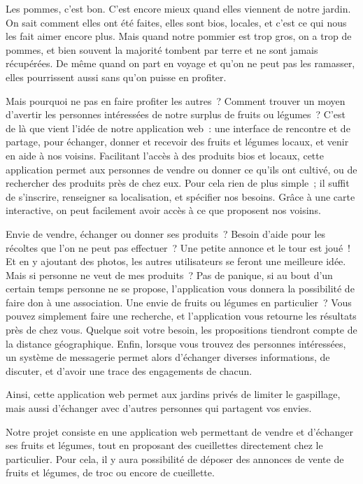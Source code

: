 \documentclass{article}
\begin{document}
Les pommes, c'est bon. C'est encore mieux quand elles viennent de notre jardin. On sait comment elles ont été faites, elles sont bios, locales, et c'est ce qui nous les fait aimer encore plus. Mais quand notre pommier est trop gros, on a trop de pommes, et bien souvent la majorité tombent par terre et ne sont jamais récupérées. De même quand on part en voyage et qu'on ne peut pas les ramasser, elles pourrissent aussi sans qu'on puisse en profiter.

Mais pourquoi ne pas en faire profiter les autres ? Comment trouver un moyen d'avertir les personnes intéressées de notre surplus de fruits ou légumes ? C'est de là que vient l'idée de notre application web : une interface de rencontre et de partage, pour échanger, donner et recevoir des fruits et légumes locaux, et venir en aide à nos voisins.
Facilitant l'accès à des produits bios et locaux, cette application permet aux personnes de vendre ou donner ce qu'ils ont cultivé, ou de rechercher des produits près de chez eux. Pour cela rien de plus simple ; il suffit de s'inscrire, renseigner sa localisation, et spécifier nos besoins. Grâce à une carte interactive, on peut facilement avoir accès à ce que proposent nos voisins.

Envie de vendre, échanger ou donner ses produits ? Besoin d'aide pour les récoltes que l'on ne peut pas effectuer ? Une petite annonce et le tour est joué ! Et en y ajoutant des photos, les autres utilisateurs se feront une meilleure idée. Mais si personne ne veut de mes produits ? Pas de panique, si au bout d'un certain temps personne ne se propose, l'application vous donnera la possibilité de faire don à une association.
Une envie de fruits ou légumes en particulier ? Vous pouvez simplement faire une recherche, et l'application vous retourne les résultats près de chez vous. Quelque soit votre besoin, les propositions tiendront compte de la distance géographique.
Enfin, lorsque vous trouvez des personnes intéressées, un système de messagerie permet alors d'échanger diverses informations, de discuter, et d'avoir une trace des engagements de chacun.

Ainsi, cette application web permet aux jardins privés de limiter le gaspillage, mais aussi d'échanger avec d'autres personnes qui partagent vos envies.

Notre projet consiste en une application web permettant de vendre et d'échanger ses fruits et légumes, tout en proposant des cueillettes directement chez le particulier. Pour cela, il y aura possibilité de déposer des annonces de vente de fruits et légumes, de troc ou encore de cueillette. 
\end{document}
